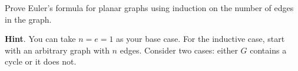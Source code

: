 \documentclass{book}
\begin{document}
\setcounter{cpjt}{25}
\addtocounter{cpjt}{-1}
\begin{activity}\label{activity-20}
\hypertarget{p-257}{}%
Prove Euler's formula for planar graphs using induction on the number of edges in the graph.%
\par\smallskip%
\noindent\textbf{Hint}.\hypertarget{hint-7}{}\quad%
\hypertarget{p-258}{}%
You can take \(n = e = 1\) as your base case.  For the inductive case, start with an arbitrary graph with \(n\) edges.  Consider two cases: either \(G\) contains a cycle or it does not.%
\end{activity}

\clearpage
\end{document}
